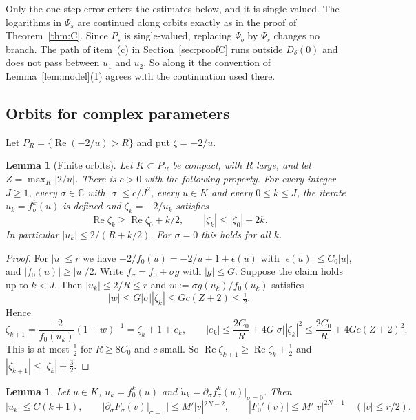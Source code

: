 \documentclass[11pt]{amsart}
\newtheorem{lemma}[theorem]{Lemma}
\theoremstyle{definition}
\begin{document}
Only the one-step error enters the estimates below, and it is single-valued.
The logarithms in $\Psi_s$ are continued along orbits exactly as in the proof of
Theorem~\ref{thm:C}.  Since $P_s$ is single-valued, replacing $\Psi_b$ by
$\Psi_s$ changes no branch.  The path of item~(c) in Section~\ref{sec:proofC}
runs outside $D_\delta(0)$ and does not pass between $u_1$ and $u_2$.  So
along it the convention of Lemma~\ref{lem:model}(1) agrees with the continuation
used there.

\subsection{Orbits for complex parameters}
Let $P_R=\{\operatorname{Re}(-2/u)>R\}$ and put $\zeta=-2/u$.

\begin{lemma}[Finite orbits]\label{lem:finite}
Let $K\subset P_R$ be compact, with $R$ large, and let
$Z=\max_K|2/u|$.  There is $c>0$ with the following property.  For every
integer $J\ge1$, every $\sigma\in\mathbb C$ with $|\sigma|\le c/J^2$, every
$u\in K$ and every $0\le k\le J$, the iterate $u_k=f_\sigma^k(u)$ is defined
and $\zeta_k=-2/u_k$ satisfies
\[
 \operatorname{Re}\zeta_k\ge\operatorname{Re}\zeta_0+k/2,\qquad
 |\zeta_k|\le|\zeta_0|+2k .
\]
In particular $|u_k|\le2/(R+k/2)$.  For $\sigma=0$ this holds for all $k$.
\end{lemma}

\begin{proof}
For $|u|\le r$ we have $-2/f_0(u)=-2/u+1+\epsilon(u)$ with $|\epsilon(u)|\le C_0|u|$,
and $|f_0(u)|\ge|u|/2$.  Write $f_\sigma=f_0+\sigma g$ with $|g|\le G$.
Suppose the claim holds up to $k<J$.  Then $|u_k|\le2/R\le r$ and
$w:=\sigma g(u_k)/f_0(u_k)$ satisfies
\[
 |w|\le G|\sigma||\zeta_k|\le Gc(Z+2)\le\tfrac12 .
\]
Hence
\[
 \zeta_{k+1}=\frac{-2}{f_0(u_k)}(1+w)^{-1}=\zeta_k+1+e_k,\qquad
 |e_k|\le\frac{2C_0}R+4G|\sigma||\zeta_k|^2\le\frac{2C_0}R+4Gc(Z+2)^2 .
\]
This is at most $\tfrac12$ for $R\ge8C_0$ and $c$ small.  So
$\operatorname{Re}\zeta_{k+1}\ge\operatorname{Re}\zeta_k+\tfrac12$ and
$|\zeta_{k+1}|\le|\zeta_k|+\tfrac32$.
\end{proof}

\begin{lemma}\label{lem:derbounds}
Let $u\in K$, $u_k=f_0^k(u)$ and $\dot u_k=\partial_\sigma f_\sigma^k(u)|_{\sigma=0}$.
Then
\[
 |\dot u_k|\le C(k+1),\qquad |\partial_\sigma F_\sigma(v)|_{\sigma=0}|\le M'|v|^{2N-2},\qquad
 |F_0'(v)|\le M'|v|^{2N-1}\quad(|v|\le r/2).
\]
\end{lemma}
\end{document}
